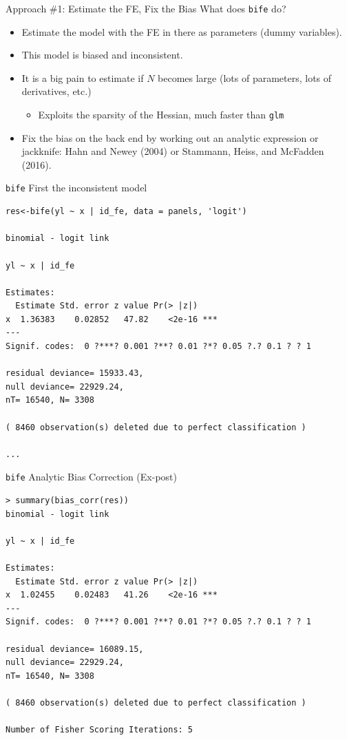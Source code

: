 \documentclass[xcolor=pdftex,dvipsnames,table,mathserif,aspectratio=169]{beamer}
\begin{document}
\begin{frame}{Approach \#1: Estimate the FE, Fix the Bias }
What does \texttt{bife} do?
\begin{itemize}
\item Estimate the model with the FE in there as parameters (dummy variables).
\item This model is \alert{biased} and \alert{inconsistent}.
\item It is a big pain to estimate if $N$ becomes large (lots of parameters, lots of derivatives, etc.)
\begin{itemize}
\item Exploits the \alert{sparsity} of the Hessian, much faster than \texttt{glm}
\end{itemize}
\item Fix the bias on the back end by working out an analytic expression or jackknife: Hahn and Newey (2004) or Stammann,  Heiss, and McFadden (2016).
\end{itemize}
\end{frame}

\begin{frame}[fragile]{\texttt{bife} First the inconsistent model}
\scriptsize
\begin{verbatim}
res<-bife(yl ~ x | id_fe, data = panels, 'logit')

binomial - logit link

yl ~ x | id_fe

Estimates:
  Estimate Std. error z value Pr(> |z|)    
x  1.36383    0.02852   47.82    <2e-16 ***
---
Signif. codes:  0 ?***? 0.001 ?**? 0.01 ?*? 0.05 ?.? 0.1 ? ? 1

residual deviance= 15933.43,
null deviance= 22929.24,
nT= 16540, N= 3308

( 8460 observation(s) deleted due to perfect classification )

...
\end{verbatim}
\end{frame}


\begin{frame}[fragile]{\texttt{bife} Analytic Bias Correction (Ex-post)}
\scriptsize
\begin{verbatim}
> summary(bias_corr(res))
binomial - logit link

yl ~ x | id_fe

Estimates:
  Estimate Std. error z value Pr(> |z|)    
x  1.02455    0.02483   41.26    <2e-16 ***
---
Signif. codes:  0 ?***? 0.001 ?**? 0.01 ?*? 0.05 ?.? 0.1 ? ? 1

residual deviance= 16089.15,
null deviance= 22929.24,
nT= 16540, N= 3308

( 8460 observation(s) deleted due to perfect classification )

Number of Fisher Scoring Iterations: 5 


\end{verbatim}
\end{frame}
\end{document}
